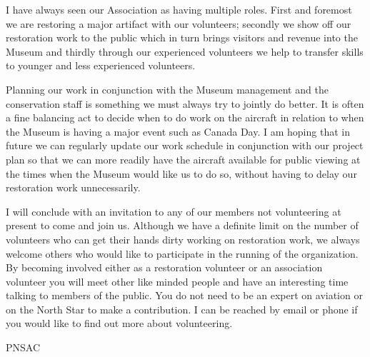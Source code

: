 I have always seen our Association as having multiple roles. First and foremost
we are restoring a major artifact with our volunteers; secondly we show off our
restoration work to the public which in turn brings visitors and revenue into
the Museum and thirdly through our experienced volunteers we help to transfer
skills to younger and less experienced volunteers.

Planning our work in conjunction with the Museum management and the conservation
staff is something we must always try to jointly do better. It is often a fine
balancing act to decide when to do work on the aircraft in relation to when the
Museum is having a major event such as Canada Day. I am hoping that in future we
can regularly update our work schedule in conjunction with our project plan so
that we can more readily have the aircraft available for public viewing at the
times when the Museum would like us to do so, without having to delay our
restoration work unnecessarily.

I will conclude with an invitation to any of our members not volunteering at
present to come and join us. Although we have a definite limit on the number of
volunteers who can get their hands dirty working on restoration work, we always
welcome others who would like to participate in the running of the organization.
By becoming involved either as a restoration volunteer or an association
volunteer you will meet other like minded people and have an interesting time
talking to members of the public. You do not need to be an expert on aviation or
on the North Star to make a contribution. I can be reached by email or phone if
you would like to find out more about volunteering.



\begin{footnotesize}
    \raggedleft PNSAC\\
\end{footnotesize}



